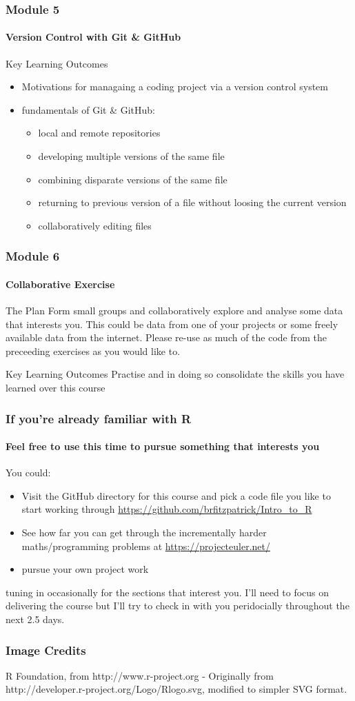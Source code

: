 \documentclass[xcolor=dvipsnames]{beamer}
\begin{document}
\begin{frame}
\frametitle{Module 5}
\framesubtitle{Version Control with Git \& GitHub}
\begin{block}{Key Learning Outcomes}
\begin{itemize}
\item Motivations for managaing a coding project via a version control system
\item fundamentals of Git \& GitHub: \begin{itemize}
  \item local and remote repositories
  \item developing multiple versions of the same file
  \item combining disparate versions of the same file
  \item returning to previous version of a file without loosing the current version
  \item collaboratively editing files
  \end{itemize}
\end{itemize}
\end{block}
\end{frame}

\begin{frame}
\frametitle{Module 6}
\framesubtitle{Collaborative Exercise}
\begin{block}{The Plan}
Form small groups and collaboratively explore and analyse some data that interests you.
This could be data from one of your projects or some freely available data from the internet.
Please re-use as much of the code from the preceeding exercises as you would like to.
\end{block}

\begin{block}{Key Learning Outcomes}
Practise and in doing so consolidate the skills you have learned over this course
\end{block}
\end{frame}

\begin{frame}
\frametitle{If you're already familiar with R}
\framesubtitle{Feel free to use this time to pursue something that interests you}
You could:
\begin{itemize}
\item Visit the GitHub directory for this course and pick a code file you like to start working through \url{https://github.com/brfitzpatrick/Intro_to_R}
\item See how far you can get through the incrementally harder maths/programming problems at \url{https://projecteuler.net/}
\item pursue your own project work
\end{itemize}
tuning in occasionally for the sections that interest you.
\newline
\newline
I'll need to focus on delivering the course but I'll try to check in with you peridocially throughout the next 2.5 days.
\end{frame}

\begin{frame} 
\frametitle{Image Credits}
R Foundation, from http://www.r-project.org - Originally from http://developer.r-project.org/Logo/Rlogo.svg, modified to simpler SVG format.
%
\end{frame}
\end{document}
